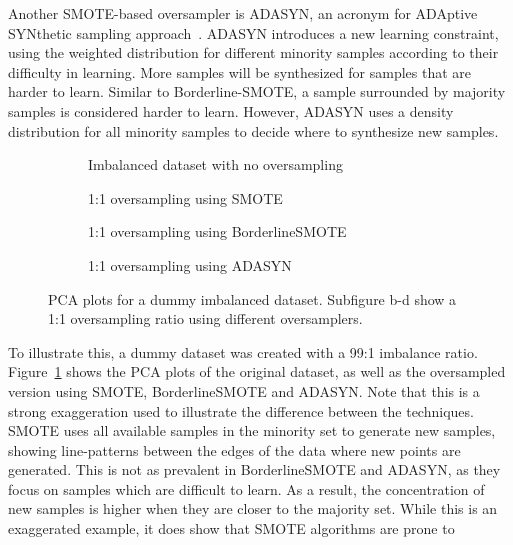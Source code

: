 Another SMOTE-based oversampler is ADASYN, an acronym for ADAptive SYNthetic sampling approach~\cite{He2008ADASYN:Learning}. ADASYN introduces a new learning constraint, using the weighted distribution for different minority samples according to their difficulty in learning. More samples will be synthesized for samples that are harder to learn. Similar to Borderline-SMOTE, a sample surrounded by majority samples is considered harder to learn. However, ADASYN uses a density distribution for all minority samples to decide where to synthesize new samples.

\begin{figure}
  \begin{subfigure}[t]{.5\textwidth}
    \centering
    
    \caption{Imbalanced dataset with no oversampling}
  \end{subfigure}
  \hfill
  \begin{subfigure}[t]{.5\textwidth}
    \centering
    
    \caption{1:1 oversampling using SMOTE}
  \end{subfigure}

  \medskip

  \begin{subfigure}[t]{.5\textwidth}
    \centering
    
    \caption{1:1 oversampling using BorderlineSMOTE}
  \end{subfigure}
  \hfill
  \begin{subfigure}[t]{.5\textwidth}
    \centering
    
    \caption{1:1 oversampling using ADASYN}
  \end{subfigure}
\caption{PCA plots for a dummy imbalanced dataset. Subfigure b-d show a 1:1 oversampling ratio using different oversamplers.}
\label{fig:oversampling}
\end{figure}

To illustrate this, a dummy dataset was created with a 99:1 imbalance ratio. Figure~\ref{fig:oversampling} shows the PCA plots of the original dataset, as well as the oversampled version using SMOTE, BorderlineSMOTE and ADASYN. Note that this is a strong exaggeration used to illustrate the difference between the techniques. SMOTE uses all available samples in the minority set to generate new samples, showing line-patterns between the edges of the data where new points are generated. This is not as prevalent in BorderlineSMOTE and ADASYN, as they focus on samples which are difficult to learn. As a result, the concentration of new samples is higher when they are closer to the majority set. While this is an exaggerated example, it does show that SMOTE algorithms are prone to 